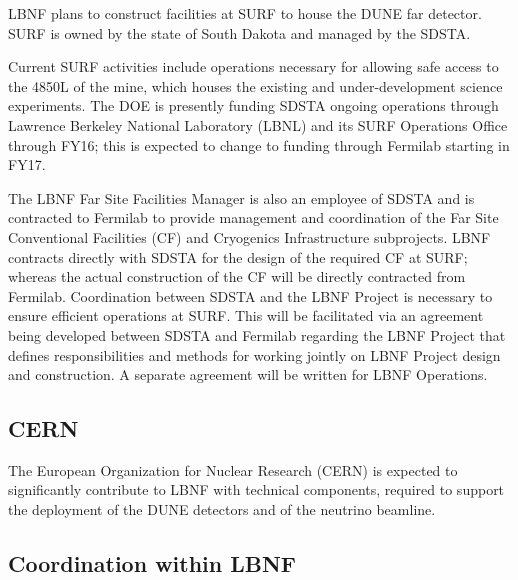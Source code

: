 LBNF plans to construct facilities at SURF to house the DUNE far detector. SURF is owned by the state of South Dakota and managed by the SDSTA. 

Current SURF activities include operations necessary for allowing safe access to the 4850L of the mine, which houses the existing and under-development science experiments. The DOE is presently funding SDSTA ongoing operations through Lawrence Berkeley National Laboratory (LBNL) and its SURF Operations Office through FY16; this is expected to change to funding through Fermilab starting in FY17. 

The LBNF Far Site Facilities Manager is also an employee of SDSTA and is contracted to Fermilab to provide management and coordination of the Far Site Conventional Facilities (CF) and Cryogenics Infrastructure subprojects. LBNF contracts directly with SDSTA for the design of the required CF at SURF; whereas the actual construction of the CF will be directly contracted from Fermilab. Coordination between SDSTA and the LBNF Project is necessary to ensure efficient operations at SURF. This will be facilitated via an agreement being developed between SDSTA and Fermilab regarding the LBNF Project  that defines responsibilities and methods for working jointly on LBNF Project design and construction. A separate agreement will be written for LBNF Operations. 

\subsection{CERN}

The European Organization for Nuclear Research (CERN) is expected to significantly contribute to LBNF with technical components, required to support the deployment of the DUNE detectors and of the neutrino beamline. 

\subsection{Coordination within LBNF}

